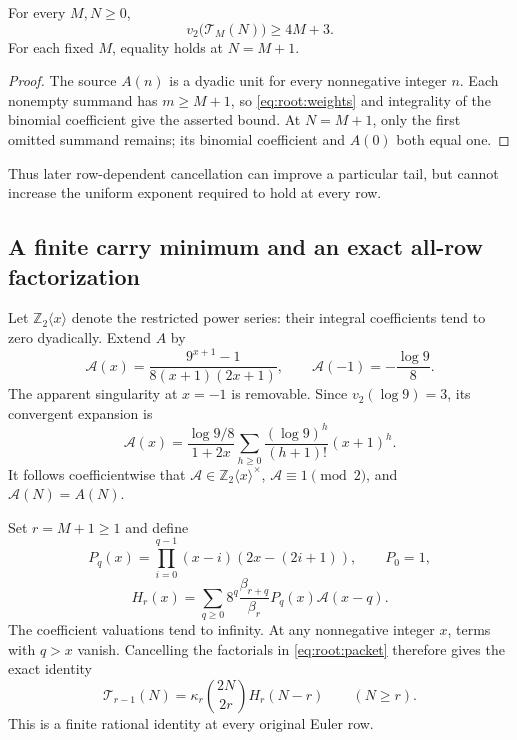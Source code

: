 \begin{proposition}
For every $M,N\ge0$,
\[
 v_2\bigl(\mathcal T_M(N)\bigr)\ge4M+3.
\]
For each fixed $M$, equality holds at $N=M+1$.
\end{proposition}
\begin{proof}
The source $A(n)$ is a dyadic unit for every nonnegative integer $n$.
Each nonempty summand has $m\ge M+1$, so
\eqref{eq:root:weights} and integrality of the binomial coefficient give
the asserted bound. At $N=M+1$, only the first omitted summand remains;
its binomial coefficient and $A(0)$ both equal one.
\end{proof}

Thus later row-dependent cancellation can improve a particular tail,
but cannot increase the uniform exponent required to hold at every row.

\subsection{A finite carry minimum and an exact all-row factorization}
\label{app:root:factorization}

Let $\mathbb Z_2\langle x\rangle$ denote the restricted power series:
their integral coefficients tend to zero dyadically. Extend $A$ by
\[
 \mathscr A(x)=\frac{9^{x+1}-1}{8(x+1)(2x+1)},
 \qquad \mathscr A(-1)=-\frac{\log9}{8}.
\]
The apparent singularity at $x=-1$ is removable. Since
$v_2(\log9)=3$, its convergent expansion is
\begin{equation}
 \mathscr A(x)=\frac{\log9/8}{1+2x}
   \sum_{h\ge0}\frac{(\log9)^h}{(h+1)!}(x+1)^h.
 \label{eq:root:source}
\end{equation}
It follows coefficientwise that
$\mathscr A\in\mathbb Z_2\langle x\rangle^\times$,
$\mathscr A\equiv1\pmod2$, and $\mathscr A(N)=A(N)$.

Set $r=M+1\ge1$ and define
\[
 P_q(x)=\prod_{i=0}^{q-1}(x-i)(2x-(2i+1)),\qquad P_0=1,
\]
\[
 H_r(x)=\sum_{q\ge0}8^q\frac{\beta_{r+q}}{\beta_r}
                    P_q(x)\mathscr A(x-q).
\]
The coefficient valuations tend to infinity. At any nonnegative integer
$x$, terms with $q>x$ vanish. Cancelling the factorials in
\eqref{eq:root:packet} therefore gives the exact identity
\begin{equation}
 \mathcal T_{r-1}(N)=\kappa_r\binom{2N}{2r}H_r(N-r)
 \qquad(N\ge r).\label{eq:root:factor}
\end{equation}
This is a finite rational identity at every original Euler row.

